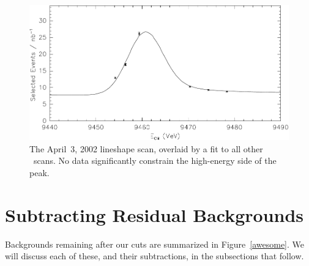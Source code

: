 \documentclass{cornell}
\begin{document}
\begin{figure}[t]
  \begin{center}
    \includegraphics[width=0.8\linewidth]{newnewplots/apr03scan}
  \end{center}
  \caption[The rejected April 3, 2002 scan]{\label{apr03scan} The
  April~3, 2002 lineshape scan, overlaid by a fit to all other \us\
  scans.  No data significantly constrain the high-energy side of the
  peak.}
\end{figure}

\section{Subtracting Residual Backgrounds}

Backgrounds remaining after our cuts are summarized in Figure~\ref{awesome}.  We will discuss each of these, and their subtractions,
in the subsections that follow.
\end{document}
